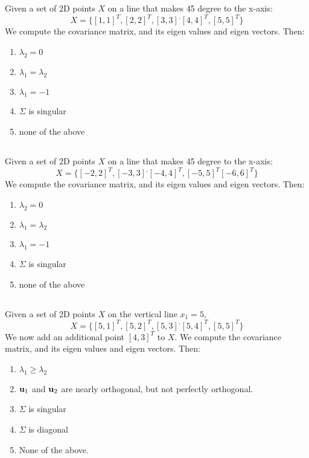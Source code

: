 \begin{frame}
\section{}
  Given a set of 2D points $X$ on a line that makes 45 degree to the x-axis:
  \[ X = \{ [1,1]^T, [2,2]^T, [3,3]^, [4,4]^T, [5,5]^T \}\]
  We compute the covariance matrix, and its eigen values and eigen vectors. Then:

    \begin{enumerate}[label=(\Alph*)]
      \item  $\lambda_2 = 0$    %
      \item  $\lambda_1 = \lambda_2$
      \item  $\lambda_1 = -1$
      \item  $\Sigma$ is singular   %
      \item none of the above   %
    \end{enumerate}
\end{frame}

\begin{frame}
\section{}
  Given a set of 2D points $X$ on a line that makes 45 degree to the x-axis:
  \[ X = \{  [-2,2]^T, [-3,3]^, [-4,4]^T, [-5,5]^T [-6,6]^T \}\]
  We compute the covariance matrix, and its eigen values and eigen vectors. Then:
  \begin{enumerate}[label=(\Alph*)]
     \item  $\lambda_2 = 0$    %
     \item  $\lambda_1 = \lambda_2$
     \item  $\lambda_1 = -1$
     \item  $\Sigma$ is singular    %
     \item none of the above     %
     \end{enumerate}
\end{frame}

\begin{frame}
\section{}
  Given a set of 2D points $X$ on the vertical line $x_1=5$,
   \[ X = \{ [5,1]^T, [5,2]^T, [5,3]^, [5,4]^T, [5,5]^T \}\]
  We now add an additional point $[4,3]^T$ to $X$.
  We compute the covariance matrix, and its eigen values and eigen vectors. Then:
    \begin{enumerate}[label=(\Alph*)]
     \item $\lambda_1 \geq \lambda_2$   %
     \item ${\bf u}_1$ and ${\bf u}_2$ are nearly orthogonal, but not perfectly orthogonal.
     \item  $\Sigma$ is singular
     \item  $\Sigma$ is diagonal    %
     \item None of the above.   %
    \end{enumerate}
\end{frame}

